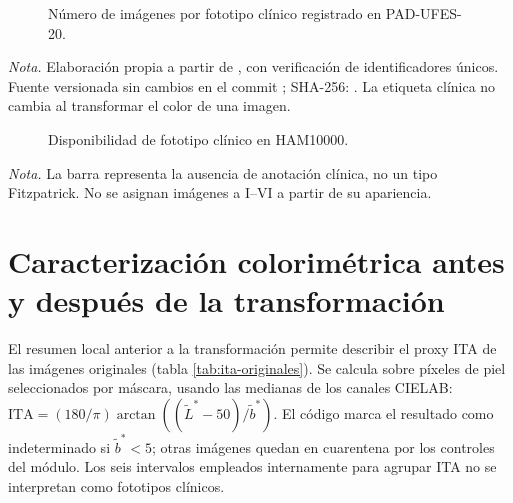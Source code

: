 \begin{figure}[htbp]
\centering
{}
\caption{Número de imágenes por fototipo clínico registrado en PAD-UFES-20.}
\label{fig:pad-fototipo-clinico}
\end{figure}
\noindent\textit{Nota.} Elaboración propia a partir de , con verificación de identificadores únicos. Fuente versionada sin cambios en el commit ; SHA-256: . La etiqueta clínica no cambia al transformar el color de una imagen.

\begin{figure}[htbp]
\centering
{}
\caption{Disponibilidad de fototipo clínico en HAM10000.}
\label{fig:ham-fototipo-no-reportado}
\end{figure}
\noindent\textit{Nota.} La barra representa la ausencia de anotación clínica, no un tipo Fitzpatrick. No se asignan imágenes a I--VI a partir de su apariencia.

\section{Caracterización colorimétrica antes y después de la transformación}

El resumen local anterior a la transformación permite describir el proxy ITA de las imágenes originales (tabla \ref{tab:ita-originales}). Se calcula sobre píxeles de piel seleccionados por máscara, usando las medianas de los canales CIELAB: $\mathrm{ITA}=(180/\pi)\arctan((\widetilde L^*-50)/\widetilde b^*)$. El código marca el resultado como indeterminado si $\widetilde b^*<5$; otras imágenes quedan en cuarentena por los controles del módulo. Los seis intervalos empleados internamente para agrupar ITA no se interpretan como fototipos clínicos.

